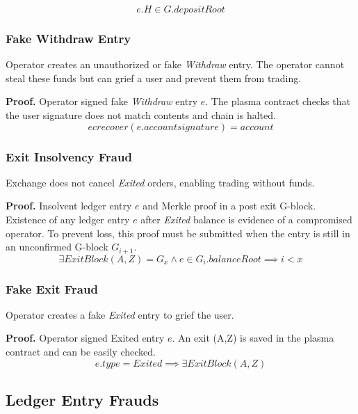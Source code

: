 \documentclass[12pt,a4paper]{article}
\begin{document}
\begin{equation}
    e.H \in G.depositRoot
\end{equation}

\subsubsection{Fake Withdraw Entry} \label{fp:fwe}
Operator creates an unauthorized or fake \emph{Withdraw} entry. The operator cannot steal these funds but can grief a user and prevent them from trading. 

\textbf{Proof.} Operator signed fake \emph{Withdraw} entry $e$. The plasma contract checks that the user signature does not match contents and chain is halted.
\begin{equation}
ecrecover(e.accountsignature) = account
\end{equation}


\subsubsection{Exit Insolvency Fraud}\label{fp:eif}
Exchange does not cancel \emph{Exited} orders, enabling trading without funds.

\textbf{Proof.} Insolvent ledger entry $e$ and Merkle proof in a post exit G-block. Existence of any ledger entry $e$ after \emph{Exited} balance is evidence of a compromised operator. To prevent loss, this proof must be submitted when the entry is still in an unconfirmed G-block $G_{i+1}$.
\begin{equation}
\exists ExitBlock(A,Z) = G_x \wedge e \in G_{i}.balanceRoot \implies i < x
\end{equation}

\subsubsection{Fake Exit Fraud}\label{fp:fef}
Operator creates a fake \emph{Exited} entry to grief the user.

\textbf{Proof.} Operator signed Exited entry $e$. An exit (A,Z) is saved in the plasma contract and can be easily checked.
\begin{equation}
    e.type=Exited \implies \exists ExitBlock(A,Z)
\end{equation}

\subsection{Ledger Entry Frauds}
\end{document}
